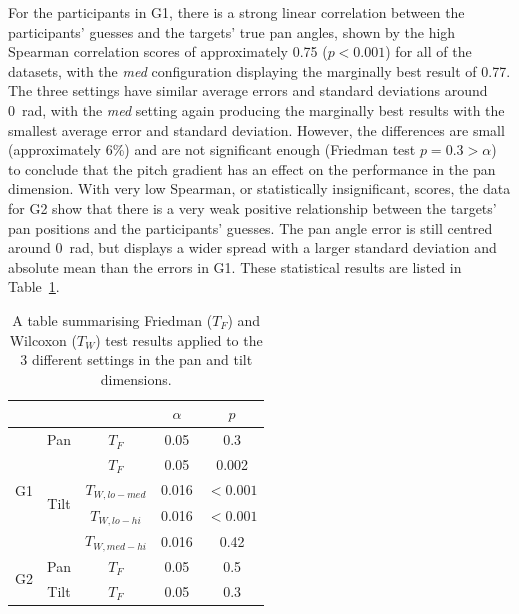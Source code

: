 \documentclass[sigconf, review=true, screen=true, anonymous=true]{acmart}
\begin{document}
For the participants in G1, there is a strong linear correlation between the participants' guesses and the targets' true pan angles, shown by the high Spearman correlation scores of approximately 0.75 ($p < 0.001$) for all of the datasets, with the \emph{med} configuration displaying the marginally best result of 0.77.
The three settings have similar average errors and standard deviations around \SI{0}{\radian}, with the \emph{med} setting again producing the marginally best results with the smallest average error and standard deviation.
However, the differences are small (approximately 6\%) and are not significant enough (Friedman test $p=0.3>\alpha$) to conclude that the pitch gradient has an effect on the performance in the pan dimension.
With very low Spearman, or statistically insignificant, scores, the data for G2 show that there is a very weak positive relationship between the targets' pan positions and the participants' guesses. 
The pan angle error is still centred around \SI{0}{\radian}, but displays a wider spread with a larger standard deviation and absolute mean than the errors in G1. 
These statistical results are listed in Table~\ref{tab:err-results}.

\begin{table}
  \centering
  \caption{A table summarising Friedman ($T_F$) and Wilcoxon ($T_W$) test results applied to the 3 different settings in the pan and tilt dimensions. }
  \label{tab:err-results}
  \begin{tabular}{ccccc}
    \toprule
    & & & $\alpha$ & $p$ \\\midrule
    \multirow{5}{*}{G1} & Pan & $T_F$ & 0.05 & 0.3 \\\cmidrule{3-5}
	 & \multirow{4}{*}{Tilt} & $T_F$ & 0.05 & 0.002 \\ 
	 & & $T_{W, lo - med}$ & 0.016 & $<0.001$ \\ 
	 & & $T_{W, lo - hi}$  & 0.016 & $<0.001$ \\ 
	 & & $T_{W, med - hi}$ & 0.016 & 0.42 \\\midrule 
    \multirow{2}{*}{G2} & Pan & $T_F$ & 0.05 & 0.5 \\\cmidrule{3-5}
	 & Tilt & $T_F$ & 0.05 & 0.3 \\ 
    \bottomrule
  \end{tabular}
\end{table}

\end{document}
